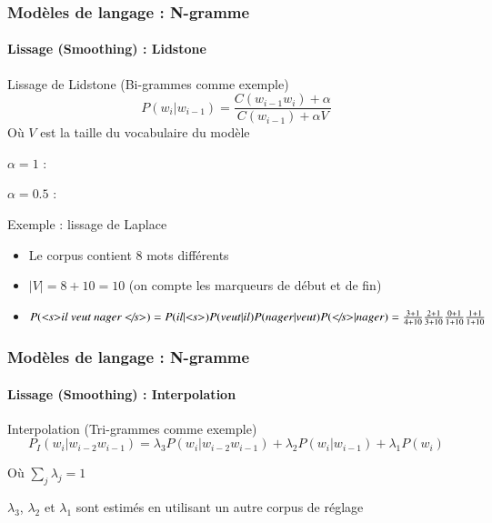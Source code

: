\documentclass[xcolor=table]{beamer}
\begin{document}
\begin{frame}
\frametitle{Modèles de langage : N-gramme}
\framesubtitle{Lissage (Smoothing) : Lidstone}

\begin{block}{Lissage de Lidstone (Bi-grammes comme exemple)}
	\[%
	P(w_i | w_{i-1}) = \frac{C(w_{i-1} w_i) + \alpha}{C(w_{i-1}) + \alpha V}
	\]
	Où $V$ est la taille du vocabulaire du modèle
	
	$\alpha = 1$ :  
	
	$\alpha = 0.5$ : 
\end{block}

\begin{exampleblock}{Exemple : lissage de Laplace}
	\begin{itemize}
		\item Le corpus contient 8 mots différents
		\item $|V| = 8 + 10 = 10$ (on compte les marqueurs de début et de fin)
		\item $P(\text{\textit{\textless s\textgreater il veut nager \textless/s\textgreater}}) = 
		P(il|\text{\textit{\textless s\textgreater}}) P(veut|il) P(nager|veut)  P(\text{\textit{\textless/s\textgreater}}|nager) = 
		\frac{3 + 1}{4 + 10} \frac{2 + 1}{3 + 10} \frac{0 + 1}{1 + 10} \frac{1 + 1}{1 + 10} $
	\end{itemize}
\end{exampleblock}

\end{frame}

\begin{frame}
\frametitle{Modèles de langage : N-gramme}
\framesubtitle{Lissage (Smoothing) : Interpolation}

\begin{block}{Interpolation (Tri-grammes comme exemple)}
	\[%
	P_{I}(w_i | w_{i-2} w_{i-1}) = 
	\lambda_3 P(w_i | w_{i-2} w_{i-1}) 
	+ \lambda_2 P(w_i | w_{i-1}) 
	+ \lambda_1 P(w_i) 
	\]
	
	Où $\sum_j \lambda_j = 1$
	
	$\lambda_3$, $\lambda_2$ et $\lambda_1$ sont estimés en utilisant un autre corpus de réglage
\end{block}


\end{frame}
\end{document}
